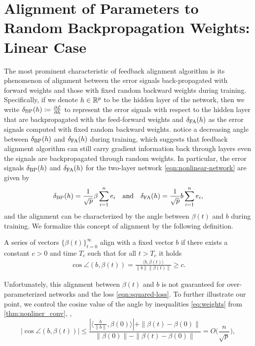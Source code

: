 
\section{Alignment of Parameters to Random Backpropagation Weights: Linear Case}\label{sec:alignment}

The most prominent characteristic of feedback alignment algorithm is its phenomenon of alignment between the error signals back-propagated with forward weights and those with fixed random backward weights during training. Specifically, if we denote $h\in \mathbb{R}^p$ to be the hidden layer of the network, then we write $\delta_\mathrm{BP}(h) \coloneqq \frac{\partial \mathcal{L}}{\partial h}$ to represent the error signals with respect to the hidden layer that are backpropagated with the feed-forward weights and $\delta_\mathrm{FA}(h)$ as the error signals computed with fixed random backward weights.
\citet{lillicrap2016random} notice a decreasing angle between $\delta_\mathrm{BP}(h)$ and $\delta_\mathrm{FA}(h)$ during training, which suggests that feedback alignment algorithm can still carry gradient information back through layers even the signals are backpropagated through random weights.
In particular, the error signals $\delta_\mathrm{BP}(h)$ and $\delta_\mathrm{FA}(h)$ for the two-layer network \eqref{eqn:nonlinear-network} are given by 
\begin{equation}
    \delta_\mathrm{BP}(h) = \frac{1}{\sqrt{p}}\beta\sum_{i=1}^ne_i \quad\text{and}\quad \delta_\mathrm{FA}(h) = \frac{1}{\sqrt{p}}b\sum_{i=1}^ne_i,
\end{equation}
and the alignment can be characterized by the angle between $\beta(t)$ and $b$ during training. We formalize this concept of alignment by the following definition.
\begin{definition}\label{def:alignment}
    A series of vectors $\{\beta(t)\}_{t=0}^\infty$ align with a fixed vector $b$ if there exists a constant $c>0$ and time $T_c$ such that for all $t > T_c$ it holds
    \begin{align*}
        \cos\angle(b, \beta(t)) = \frac{\langle b, \beta(t)\rangle}{\|b\|\|\beta(t)\|} \geq c.
    \end{align*}
\end{definition}
Unfortunately, this alignment between $\beta(t)$ and $b$ is not guaranteed for over-parameterized networks and the loss \eqref{eqn:squared-loss}. To further illustrate our point, we control the cosine value of the angle by inequalities \eqref{eq:weights} from \cref{thm:nonliner_conv}, \ie,
\begin{equation}
    \Big|\cos\angle(b, \beta(t))\Big| \leq \frac{|\langle \frac{b}{\|b\|}, \beta(0)\rangle|+ \|\beta(t)- \beta(0)\|}{\|\beta(0)\|-\|\beta(t)-\beta(0)\|} = O\big(\frac{n}{\sqrt p}\big),
\end{equation}
